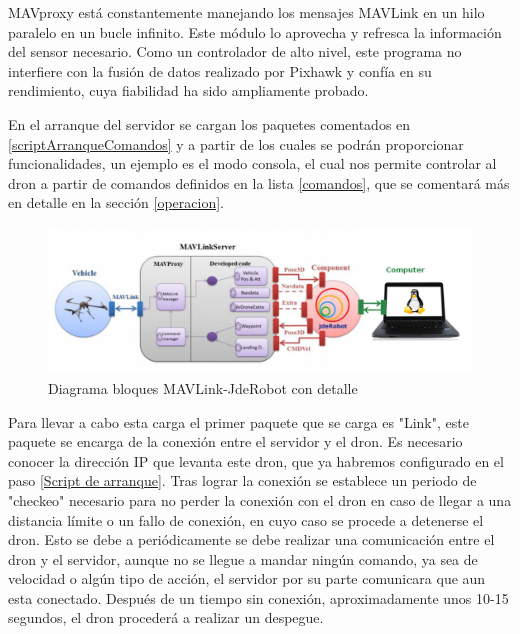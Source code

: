 MAVproxy está constantemente manejando los mensajes MAVLink en un hilo paralelo en un bucle infinito. Este módulo lo aprovecha y refresca la información del sensor necesario. Como un controlador de alto nivel, este programa no interfiere con la fusión de datos realizado por Pixhawk y confía en su rendimiento, cuya fiabilidad ha sido ampliamente probado.

En el arranque del servidor se cargan los paquetes comentados en \ref{scriptArranqueComandos} y a partir de los cuales se podrán proporcionar funcionalidades, un ejemplo es el modo consola, el cual nos permite controlar al dron a partir de comandos definidos en la lista \ref{comandos}, que se comentará más en detalle en la sección \ref{operacion}.

\begin{figure}[H]
  \centering
  \includegraphics[scale=0.35]{imagenes/cajaTrasparente.png}
  \caption{Diagrama bloques MAVLink-JdeRobot con detalle}
  \label{fig:mavLinkJdeRobotTrasparente}
\end{figure}


Para llevar a cabo esta carga el primer paquete que se carga es "Link", este paquete se encarga de la conexión entre el servidor y el dron. Es necesario conocer la dirección IP que levanta este dron, que ya habremos configurado en el paso \ref{Script de arranque}. Tras lograr la conexión se establece un periodo de "checkeo" necesario para no perder la conexión con el dron en caso de llegar a una distancia límite o un fallo de conexión, en cuyo caso se procede a detenerse el dron. Esto se debe a periódicamente se debe realizar una comunicación entre el dron y el servidor, aunque no se llegue a mandar ningún comando, ya sea de velocidad o algún tipo de acción, el servidor por su parte comunicara que aun esta conectado. Después de un tiempo sin conexión, aproximadamente unos 10-15 segundos, el dron procederá a realizar un despegue. 



